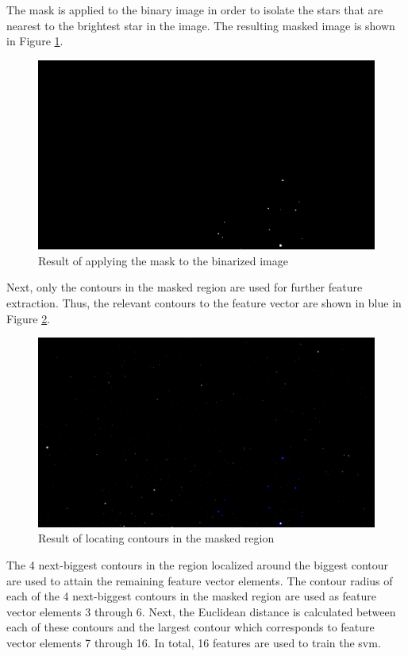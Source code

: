 \documentclass[10pt,twocolumn,letterpaper]{article}
\begin{document}
The mask is applied to the binary image in order to isolate the stars that are nearest to the brightest star in the image. The resulting masked image is shown in Figure \ref{fig:star_masked}.

\begin{figure}[H]
  \centering
   \includegraphics[width=0.9\linewidth]{masked}
   \caption{Result of applying the mask to the binarized image}
   \label{fig:star_masked}
\end{figure}

Next, only the contours in the masked region are used for further feature extraction. Thus, the relevant contours to the feature vector are shown in blue in Figure \ref{fig:star_local_contours}.

\begin{figure}[H]
  \centering
   \includegraphics[width=0.9\linewidth]{local_contours}
   \caption{Result of locating contours in the masked region}
   \label{fig:star_local_contours}
\end{figure}

The 4 next-biggest contours in the region localized around the biggest contour are used to attain the remaining feature vector elements. The contour radius of each of the 4 next-biggest contours in the masked region are used as feature vector elements 3 through 6. Next, the Euclidean distance is calculated between each of these contours and the largest contour which corresponds to feature vector elements 7 through 16. In total, 16 features are used to train the \acrshort{svm}.
\end{document}
